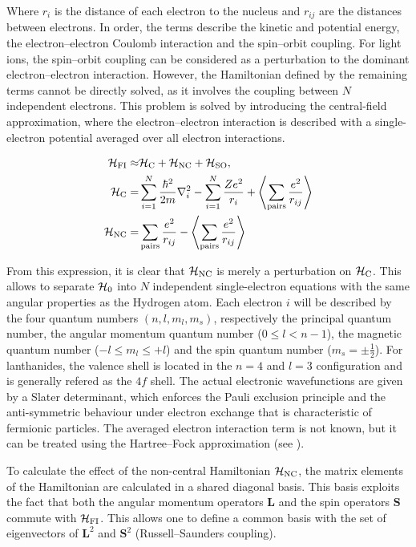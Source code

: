 Where $r_i$ is the distance of each electron to the nucleus and $r_{ij}$ are the distances between electrons. In order, the terms describe the kinetic and potential energy, the electron--electron Coulomb interaction and the spin--orbit coupling. For light ions, the spin--orbit coupling can be considered as a perturbation to the dominant electron--electron interaction. However, the Hamiltonian defined by the remaining terms cannot be directly solved, as it involves the coupling between $N$ independent electrons. This problem is solved by introducing the central-field approximation, where the electron--electron interaction is described with a single-electron potential averaged over all electron interactions. 

\begin{align}
\begin{split}
    \mathcal{H}_{\text{FI}} \approx& \mathcal{H}_{\text{C}} + \mathcal{H}_{\text{NC}} + \mathcal{H}_{\text{SO}}, \\
    \mathcal{H}_{\text{C}} =& \sum_{i=1}^N \frac{\hbar^2}{2m} \nabla_i^2  - \sum_{i=1}^N \frac{Ze^2}{r_i} + \left\langle\sum_{\text{pairs}} \frac{e^2}{r_{ij}}\right\rangle\\
    \mathcal{H}_{\text{NC}} =& \sum_{\text{pairs}} \frac{e^2}{r_{ij}} - \left\langle\sum_{\text{pairs}} \frac{e^2}{r_{ij}}\right\rangle
\end{split}
\end{align}

From this expression, it is clear that $\mathcal{H}_{\text{NC}}$ is merely a perturbation on $\mathcal{H}_{\text{C}}$. This allows to separate $\mathcal{H}_{\text{0}}$ into $N$ independent single-electron equations with the same angular properties as the Hydrogen atom. Each electron $i$ will be described by the four quantum numbers $(n, l, m_l, m_s)$, respectively the principal quantum number, the angular momentum quantum number ($0\leq l<n-1$), the magnetic quantum number ($-l\leq m_l\leq +l$) and the spin quantum number ($m_s=\pm\tfrac{1}{2}$). For lanthanides, the valence shell is located in the $n=4$ and $l=3$ configuration and is generally refered as the $4f$ shell. The actual electronic wavefunctions are given by a Slater determinant, which enforces the Pauli exclusion principle and the anti-symmetric behaviour under electron exchange that is characteristic of fermionic particles. The averaged electron interaction term is not known, but it can be treated using the Hartree--Fock approximation (see \cite{weissbluth_atoms_2012}).

To calculate the effect of the non-central Hamiltonian $\mathcal{H}_{\text{NC}}$, the matrix elements of the Hamiltonian are calculated in a shared diagonal basis. This basis exploits the fact that both the angular momentum operators $\mathbf{L}$ and the spin operators $\mathbf{S}$ commute with $\mathcal{H}_{\text{FI}}$. This allows one to define a common basis with the set of eigenvectors of $\mathbf{L}^2$ and $\mathbf{S}^2$ (Russell--Saunders coupling).

